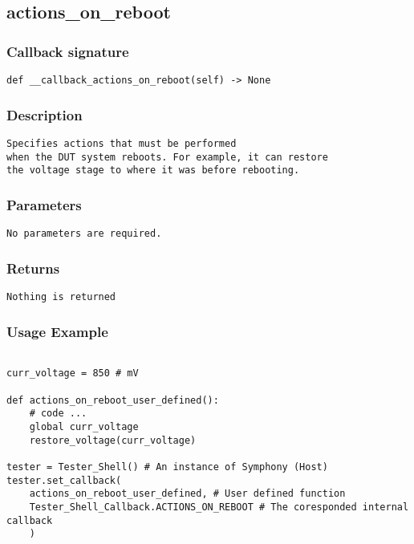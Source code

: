 \subsection{actions\_on\_reboot}

\subsubsection{Callback signature}
\begin{lstlisting}
def __callback_actions_on_reboot(self) -> None
\end{lstlisting}

\subsubsection{Description}
\begin{lstlisting}[mathescape=true, keywordstyle=\color{black}, showstringspaces=false]
Specifies actions that must be performed 
when the DUT system reboots. For example, it can restore 
the voltage stage to where it was before rebooting. 
\end{lstlisting}

\subsubsection{Parameters}
\begin{lstlisting}[mathescape=true, keywordstyle=\color{black}]
No parameters are required.
\end{lstlisting}

\subsubsection{Returns}
\begin{lstlisting}[mathescape=true, keywordstyle=\color{black}]
Nothing is returned
\end{lstlisting}


\subsubsection{Usage Example}
\begin{lstlisting}

curr_voltage = 850 # mV

def actions_on_reboot_user_defined():
    # code ... 
    global curr_voltage
    restore_voltage(curr_voltage)

tester = Tester_Shell() # An instance of Symphony (Host)
tester.set_callback(
    actions_on_reboot_user_defined, # User defined function
    Tester_Shell_Callback.ACTIONS_ON_REBOOT # The coresponded internal callback
    )
\end{lstlisting}
